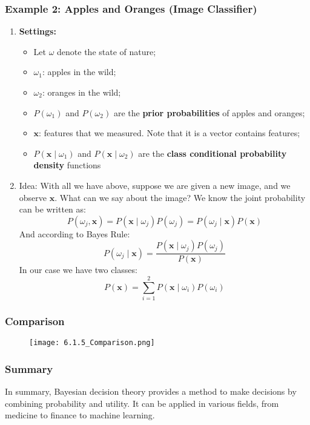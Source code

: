 \documentclass{article}
\begin{document}
\subsubsection{Example 2: Apples and Oranges (Image Classifier)}
\begin{enumerate}
    \item \textbf{Settings:}
        \begin{itemize}
            \item Let $\omega$ denote the state of nature;
            \item $\omega_1$: apples in the wild;
            \item $\omega_2$: oranges in the wild;
            \item $P(\omega_1)$ and $P(\omega_2)$ are the \textbf{prior probabilities} of apples and oranges;
            \item $\bm{x}$: features that we measured. Note that it is a vector contains features;
            \item $P(\bm{x} \mid \omega_1)$ and $P(\bm{x} \mid \omega_2)$ are the \textbf{class conditional probability density} functions
        \end{itemize}
    \item Idea: With all we have above, suppose we are given a new image, and we observe $\bm{x}$. What can we say about the image? We know the joint probability can be written as:
    \[ P(\omega_j, \bm{x}) = P(\bm{x} \mid \omega_j)P(\omega_j)=P(\omega_j \mid \bm{x})P(\bm{x})\]
    And according to Bayes Rule:
    \[ P(\omega_j \mid \bm{x}) = \frac{P(\bm{x} \mid \omega_j)P(\omega_j)}{P(\bm{x})} \]
    In our case we have two classes:
    \[ P(\bm{x}) = \sum_{i=1}^{2}P(\bm{x} \mid \omega_i)P(\omega_i) \]
\end{enumerate}

\subsubsection{Comparison}
\begin{figure}[h]
\centering
\texttt{[image: 6.1.5\_Comparison.png]}
\end{figure}

\subsubsection{Summary}
In summary, Bayesian decision theory provides a method to make decisions by combining probability and utility. It can be applied in various fields, from medicine to finance to machine learning.
\newpage
\end{document}
